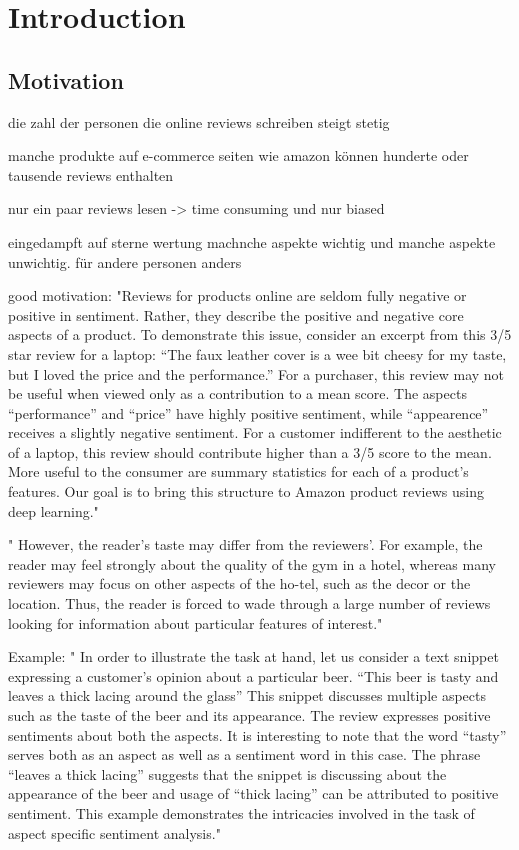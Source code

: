 \chapter{Introduction}
\label{chap:introduction}

\section{Motivation}
\label{sec:introduction_motivation}

die zahl der personen die online reviews schreiben steigt stetig

manche produkte auf e-commerce seiten wie amazon können hunderte oder tausende reviews enthalten

nur ein paar reviews lesen -> time consuming und nur biased 

eingedampft auf sterne wertung
machnche aspekte wichtig und manche aspekte unwichtig. für andere personen anders

good motivation: "Reviews for products online are seldom fully negative or positive in sentiment. Rather, they describe the positive and negative core aspects of a product. To demonstrate this issue, consider an excerpt from this 3/5 star review for a laptop:
“The faux leather cover is a wee bit cheesy for my taste, but I loved the price and the performance.”
For a purchaser, this review may not be useful when viewed only as a contribution to a mean score. The aspects “performance” and “price” have highly positive sentiment, while “appearence” receives a slightly negative sentiment. For a customer indifferent to the aesthetic of a laptop, this review should contribute higher than a 3/5 score to the mean.
More useful to the consumer are summary statistics for each of a product’s features. Our goal is to bring this structure to Amazon product reviews using deep learning." \cite{Marx2015}

"
However, the reader’s taste may differ
from the reviewers’. For example, the reader may feel
strongly about the quality of the gym in a hotel, whereas
many reviewers may focus on other aspects of the ho-tel, such as the decor or the location. Thus, the reader is
forced to wade through a large number of reviews looking
for information about particular features of interest." \cite{Popescu2005}

Example:
"
In order to illustrate the task at hand, let us consider a text snippet expressing a customer’s opinion
about a particular beer. “This beer is tasty and leaves a thick lacing around the glass” This snippet
discusses multiple aspects such as the taste of the beer and its appearance. The review expresses
positive sentiments about both the aspects. It is interesting to note that the word “tasty” serves both
as an aspect as well as a sentiment word in this case. The phrase “leaves a thick lacing” suggests
that the snippet is discussing about the appearance of the beer and usage of “thick lacing” can be
attributed to positive sentiment. This example demonstrates the intricacies involved in the task of
aspect specific sentiment analysis." \cite{Lakkaraju2014}


